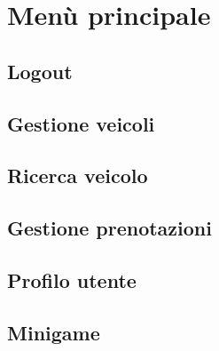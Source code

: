 \section{Menù principale}

\subsection{Logout}

\subsection{Gestione veicoli}

\subsection{Ricerca veicolo}

\subsection{Gestione prenotazioni}

\subsection{Profilo utente}

\subsection{Minigame}